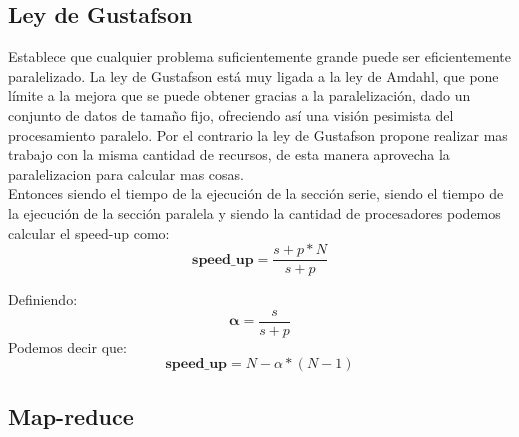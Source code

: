 \subsection{Ley de Gustafson}

Establece que cualquier problema suficientemente grande puede ser eficientemente
paralelizado. La ley de Gustafson está muy ligada a la ley de Amdahl, que pone
límite a la mejora que se puede obtener gracias a la paralelización, dado un
conjunto de datos de tamaño fijo, ofreciendo así una visión pesimista del
procesamiento paralelo. Por el contrario la ley de Gustafson  propone realizar
mas trabajo con la misma cantidad de recursos, de esta manera aprovecha la
paralelizacion para calcular mas cosas.\\

Entonces siendo  el tiempo de la ejecución de la sección serie, siendo
 el tiempo de la ejecución de la sección paralela y siendo  la
cantidad de procesadores podemos calcular el speed-up como:
\begin{equation}
    \textbf{speed\_up} = \dfrac{s+p*N}{s+p}
\end{equation}

Definiendo:
\begin{equation}
    \boldsymbol{\alpha} = \dfrac{s}{s+p}
\end{equation}
Podemos decir que:
\begin{equation}
    \textbf{speed\_up} = N - \alpha * (N-1)
\end{equation}

\subsection{Map-reduce}

